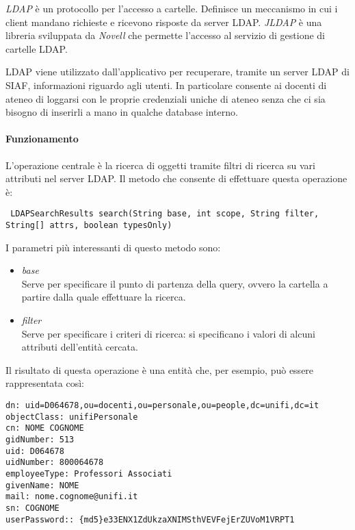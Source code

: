 \textsl{LDAP} è un protocollo per l'accesso a cartelle. Definisce un meccanismo in cui i client mandano richieste e ricevono risposte da server LDAP.
\textsl{JLDAP} è una libreria sviluppata da \textsl{Novell} che permette l'accesso al servizio di gestione di cartelle LDAP.

LDAP viene utilizzato dall'applicativo per recuperare, tramite un server LDAP di SIAF, informazioni riguardo agli utenti. In particolare consente ai docenti di ateneo di loggarsi con le proprie credenziali uniche di ateneo 
senza che ci sia bisogno di inserirli a mano in qualche database interno.

\paragraph{Funzionamento}
L'operazione centrale è la ricerca di oggetti tramite filtri di ricerca su vari attributi nel server LDAP. Il metodo che consente di effettuare questa operazione è:

\begin{lstlisting}
 LDAPSearchResults search(String base, int scope, String filter, String[] attrs, boolean typesOnly) 
\end{lstlisting}

I parametri più interessanti di questo metodo sono:
\begin{itemize}
 \item \textsl{base}\\
  Serve per specificare il punto di partenza della query, ovvero la cartella a partire dalla quale effettuare la ricerca. 
  \item \textsl{filter}\\
  Serve per specificare i criteri di ricerca: si specificano i valori di alcuni attributi dell'entità cercata.
\end{itemize}

Il risultato di questa operazione è una entità che, per esempio, può essere rappresentata così:

\begin{lstlisting}
dn: uid=D064678,ou=docenti,ou=personale,ou=people,dc=unifi,dc=it
objectClass: unifiPersonale
cn: NOME COGNOME
gidNumber: 513
uid: D064678
uidNumber: 800064678
employeeType: Professori Associati
givenName: NOME
mail: nome.cognome@unifi.it
sn: COGNOME
userPassword:: {md5}e33ENX1ZdUkzaXNIMSthVEVFejErZUVoM1VRPT1
\end{lstlisting}

